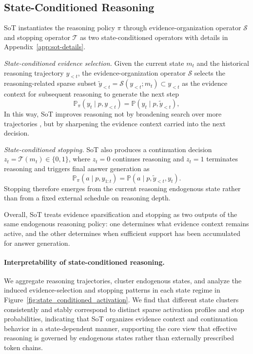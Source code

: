 \subsection{State-Conditioned Reasoning}
\label{sec:state_driven_activation}

SoT instantiates the reasoning policy \(\pi\) through evidence-organization operator \(\mathcal{S}\) and stopping operator \(\mathcal{T}\) as two state-conditioned operators with details in Appendix~\ref{app:sot-details}.

\emph{State-conditioned evidence selection.}
Given the current state \(m_t\) and the historical reasoning trajectory \(y_{<t}\), the evidence-organization operator \(\mathcal{S}\) selects the reasoning-related sparse subset \(\widetilde{y}_{<t}=\mathcal{S}(y_{<t};m_t)\subset y_{<t}\) as the evidence context for subsequent reasoning to generate the next step
\begin{equation}
\mathbb{P}_{\pi}(y_t \mid p,y_{<t}) = \mathbb{P}\!\left(y_t \mid p,\widetilde{y}_{<t}\right),
\label{eq:state_policy_select}
\end{equation}
In this way, SoT improves reasoning not by broadening search over more trajectories \citep{yao2023tree}, but by sharpening the evidence context carried into the next decision.

\emph{State-conditioned stopping.}
SoT also produces a continuation decision \(z_t=\mathcal{T}(m_t)\in\{0,1\}\), where \(z_t=0\) continues reasoning and \(z_t=1\) terminates reasoning and triggers final answer generation as
\begin{equation}
\mathbb{P}_{\pi}(a \mid p,y_{1:t}) = \mathbb{P}(a \mid p,\widetilde{y}_{<t}, y_t).
\label{eq:state_policy_step}
\end{equation}
Stopping therefore emerges from the current reasoning endogenous state rather than from a fixed external schedule \citep{hosseini2026early} on reasoning depth.

Overall, SoT treats evidence sparsification and stopping as two outputs of the same endogenous reasoning policy: one determines what evidence context remains active, and the other determines when sufficient support has been accumulated for answer generation.

\paragraph{Interpretability of state-conditioned reasoning.}
We aggregate reasoning trajectories, cluster endogenous states, and analyze the induced evidence-selection and stopping patterns in each state regime in Figure~\ref{fig:state_conditioned_activation}. 
We find that different state clusters consistently and stably correspond to distinct sparse activation profiles and stop probabilities, indicating that SoT organizes evidence context and continuation behavior in a state-dependent manner, supporting the core view that effective reasoning is governed by endogenous states rather than externally prescribed token chains.

